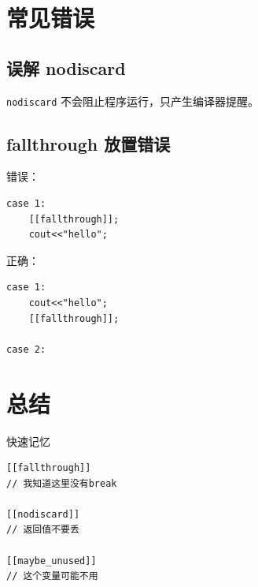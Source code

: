 \documentclass[UTF8,12pt,a4paper]{ctexart}
\begin{document}
\section{常见错误}

\subsection{误解 nodiscard}

\texttt{nodiscard} 不会阻止程序运行，只产生编译器提醒。

\subsection{fallthrough 放置错误}

错误：

\begin{lstlisting}
case 1:
    [[fallthrough]];
    cout<<"hello";
\end{lstlisting}

正确：

\begin{lstlisting}
case 1:
    cout<<"hello";
    [[fallthrough]];

case 2:
\end{lstlisting}

\section{总结}

\begin{boxx}{快速记忆}

\begin{lstlisting}
[[fallthrough]]
// 我知道这里没有break

[[nodiscard]]
// 返回值不要丢

[[maybe_unused]]
// 这个变量可能不用
\end{lstlisting}

\end{boxx}
\end{document}
